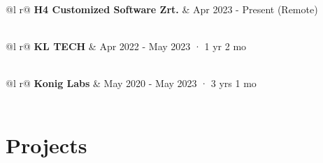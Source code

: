 \documentclass[a4paper,10pt]{article}
\begin{document}
\begin{tabularx}{\linewidth}{ @{}l r@{} }
\textbf{H4 Customized Software Zrt.} & \hfill Apr 2023 - Present (Remote) \\[3.75pt]
  \\
\end{tabularx}

\begin{tabularx}{\linewidth}{ @{}l r@{} }
\textbf{KL TECH} & \hfill Apr 2022 - May 2023 · 1 yr 2 mo \\[3.75pt]
  \\
\end{tabularx}

\begin{tabularx}{\linewidth}{ @{}l r@{} }
\textbf{Konig Labs} & \hfill May 2020 - May 2023 · 3 yrs 1 mo \\[3.75pt]
  \\
\end{tabularx}


\section{Projects}
\end{document}
